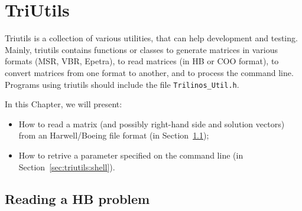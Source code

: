 % 
% 
% 
%  
%  
% 

\section{TriUtils}
\label{chap:triutils}

Triutils is a collection of various utilities, that can help development
and testing. Mainly, triutils contains functions or classes to generate
matrices in various formats (MSR, VBR, Epetra), to read matrices (in HB
or COO format), to convert matrices from one format to another, and to
process the command line. Programs using triutils should include the
file \verb!Trilinos_Util.h!.

\medskip

In this Chapter, we will present:
\begin{itemize}
\item How to read a matrix (and possibly right-hand side and solution
  vectors) from an Harwell/Boeing file format (in
  Section~\ref{sec:triutils:reading});
\item How to retrive a parameter specified on the command line (in
  Section~\ref{sec:triutils:shell}). 
\end{itemize}


\subsection{Reading a HB problem}
\label{sec:triutils:reading}

